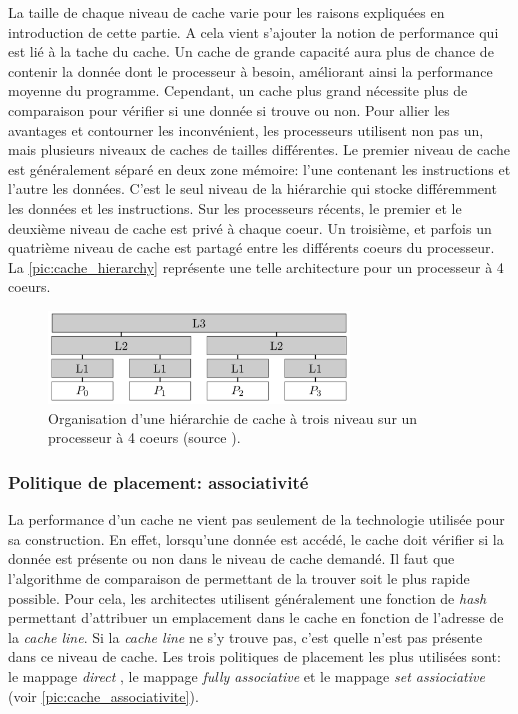 La taille de chaque niveau de cache varie pour les raisons expliquées en introduction de cette partie. A cela vient s'ajouter la notion de performance qui est lié à la tache du cache. Un cache de grande capacité aura plus de chance de contenir la donnée dont le processeur à besoin, améliorant ainsi la performance moyenne du programme. Cependant, un cache plus grand nécessite plus de comparaison pour vérifier si une donnée si trouve ou non. Pour allier les avantages et contourner les inconvénient, les processeurs utilisent non pas un, mais plusieurs niveaux de caches de tailles différentes.
Le premier niveau de cache est généralement séparé en deux zone mémoire: l'une contenant les instructions et l'autre les données. C'est le seul niveau de la hiérarchie qui stocke différemment les données et les instructions. Sur les processeurs récents, le premier et le deuxième niveau de cache est privé à chaque coeur. Un troisième, et parfois un quatrième niveau de cache est partagé entre les différents coeurs du processeur. La \autoref{pic:cache_hierarchy} représente une telle architecture pour un processeur à 4 coeurs.

\begin{figure}
    \center
    \includegraphics[width=8cm]{images/cache_hierarchy.png}
    \caption{\label{pic:cache_hierarchy} Organisation d'une hiérarchie de cache à trois niveau sur un processeur à 4 coeurs (source \cite{putigny2014benchmark}).}
\end{figure}



\subsubsection{Politique de placement: associativité}
La performance d'un cache ne vient pas seulement de la technologie utilisée pour sa construction. En effet, lorsqu'une donnée est accédé, le cache doit vérifier si la donnée est présente ou non dans le niveau de cache demandé. Il faut que l'algorithme de comparaison de permettant de la trouver soit le plus rapide possible. Pour cela, les architectes utilisent généralement une fonction de \textit{hash} permettant d'attribuer un emplacement dans le cache en fonction de l'adresse de la \textit{cache line}. Si la \textit{cache line} ne s'y trouve pas, c'est quelle n'est pas présente dans ce niveau de cache.
Les trois politiques de placement les plus utilisées sont: le mappage  \textit{direct }, le mappage \textit{fully associative} et le mappage \textit{set assiociative} (voir \autoref{pic:cache_associativite}).


